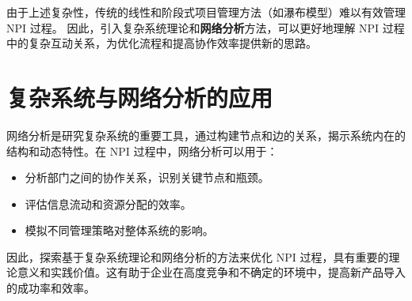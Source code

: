 由于上述复杂性，传统的线性和阶段式项目管理方法（如瀑布模型）难以有效管理 NPI 过程\citep{cooper1994third}。
因此，引入复杂系统理论和\textbf{网络分析}方法，可以更好地理解 NPI 过程中的复杂互动关系，为优化流程和提高协作效率提供新的思路\citep{newman2010networks}。

\section{复杂系统与网络分析的应用}

网络分析是研究复杂系统的重要工具，通过构建节点和边的关系，揭示系统内在的结构和动态特性\citep{barabasiNetworkScience2013}。在 NPI 过程中，网络分析可以用于：

\begin{itemize}
  \item 分析部门之间的协作关系，识别关键节点和瓶颈。
  \item 评估信息流动和资源分配的效率。
  \item 模拟不同管理策略对整体系统的影响。
\end{itemize}

因此，探索基于复杂系统理论和网络分析的方法来优化 NPI 过程，具有重要的理论意义和实践价值。这有助于企业在高度竞争和不确定的环境中，提高新产品导入的成功率和效率。